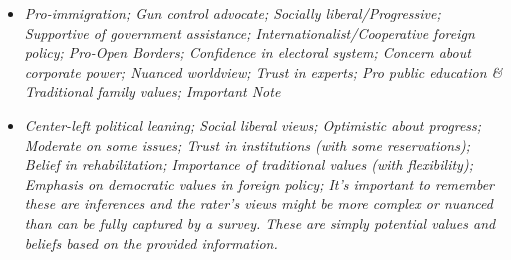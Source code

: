 \documentclass[11pt]{article}
\newcommand{\profiletext}[1]{\textit{#1}}
\begin{document}
\begin{itemize}
\item \profiletext{Pro-immigration; Gun control advocate; Socially liberal/Progressive; Supportive of government assistance; Internationalist/Cooperative foreign policy; Pro-Open Borders; Confidence in electoral system; Concern about corporate power; Nuanced worldview; Trust in experts; Pro public education \& Traditional family values; Important Note}
\item \profiletext{Center-left political leaning; Social liberal views; Optimistic about progress; Moderate on some issues; Trust in institutions (with some reservations); Belief in rehabilitation; Importance of traditional values (with flexibility); Emphasis on democratic values in foreign policy; It's important to remember these are inferences and the rater's views might be more complex or nuanced than can be fully captured by a survey. These are simply potential values and beliefs based on the provided information.}
\end{itemize}
\end{document}
